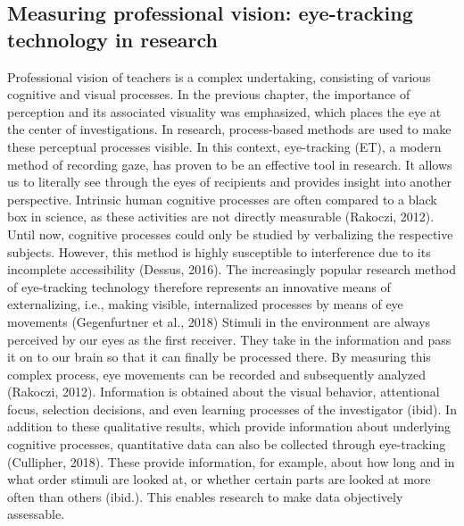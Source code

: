 \documentclass[
  man]{apa6}
\begin{document}
\subsection{Measuring professional vision: eye-tracking technology in research}\label{measuring-professional-vision-eye-tracking-technology-in-research}

Professional vision of teachers is a complex undertaking, consisting of various cognitive and visual processes. In the previous chapter, the importance of perception and its associated visuality was emphasized, which places the eye at the center of investigations. In research, process-based methods are used to make these perceptual processes visible. In this context, eye-tracking (ET), a modern method of recording gaze, has proven to be an effective tool in research. It allows us to literally see through the eyes of recipients and provides insight into another perspective. Intrinsic human cognitive processes are often compared to a black box in science, as these activities are not directly measurable (Rakoczi, 2012). Until now, cognitive processes could only be studied by verbalizing the respective subjects. However, this method is highly susceptible to interference due to its incomplete accessibility (Dessus, 2016). The increasingly popular research method of eye-tracking technology therefore represents an innovative means of externalizing, i.e., making visible, internalized processes by means of eye movements (Gegenfurtner et al., 2018) Stimuli in the environment are always perceived by our eyes as the first receiver. They take in the information and pass it on to our brain so that it can finally be processed there. By measuring this complex process, eye movements can be recorded and subsequently analyzed (Rakoczi, 2012). Information is obtained about the visual behavior, attentional focus, selection decisions, and even learning processes of the investigator (ibid). In addition to these qualitative results, which provide information about underlying cognitive processes, quantitative data can also be collected through eye-tracking (Cullipher, 2018). These provide information, for example, about how long and in what order stimuli are looked at, or whether certain parts are looked at more often than others (ibid.). This enables research to make data objectively assessable.
\end{document}
